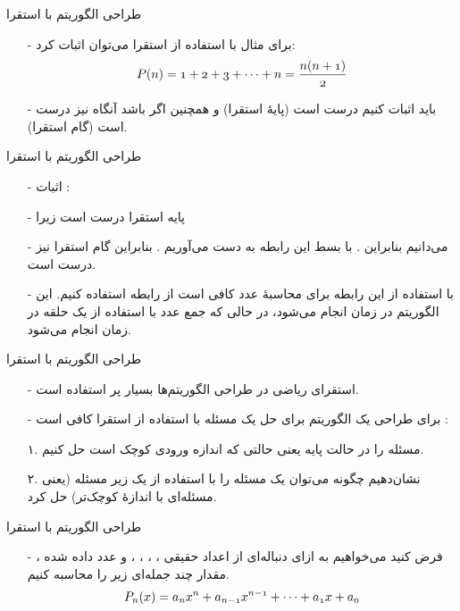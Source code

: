 \begin{frame}{‌طراحی الگوریتم با استقرا}
\begin{itemize}\itemr
\item[-]
برای مثال با استفاده از استقرا می‌توان اثبات کرد:
\begin{align*}
\mathnormal{P(n) = 1 + 2 + 3 + \cdots + n = \frac{n(n+1)}{2}}
\end{align*}
\item[-]
باید اثبات کنیم
درست است (پایهٔ استقرا) و همچنین اگر
باشد آنگاه
نیز درست است (گام استقرا).
\end{itemize}
\end{frame}


\begin{frame}{‌طراحی الگوریتم با استقرا}
\begin{itemize}\itemr
\item[-]
اثبات : 
\item[-]
پایه استقرا درست است زیرا 
\item[-]
می‌دانیم
بنابراین
 .
با بسط این رابطه به دست می‌آوریم
 .
بنابراین گام استقرا نیز درست است.
\item[-]
با استفاده از این رابطه برای محاسبهٔ
عدد کافی است از رابطه
استفاده کنیم. این الگوریتم در زمان
انجام می‌شود، در حالی که جمع 
عدد با استفاده از یک حلقه در زمان
انجام می‌شود.
\end{itemize}
\end{frame}



\begin{frame}{‌طراحی الگوریتم با استقرا}
\begin{itemize}\itemr
\item[-]
استقرای ریاضی در طراحی الگوریتم‌ها بسیار پر استفاده است.
\item[-]
برای طراحی یک الگوریتم برای حل یک مسئله با استفاده از استقرا کافی است :
\item[۱.]
مسئله را در حالت پایه یعنی حالتی که اندازه ورودی کوچک است حل کنیم.
\item[۲.]
نشان‌دهیم چگونه می‌توان یک مسئله را با استفاده از یک زیر مسئله (یعنی مسئله‌ای با اندازهٔ کوچک‌تر) حل کرد.
\end{itemize}
\end{frame}


\begin{frame}{‌طراحی الگوریتم با استقرا}
\begin{itemize}\itemr
\item[-]
فرض کنید می‌خواهیم به ازای دنباله‌ای از اعداد حقیقی
،
،
،
\m{\cdots}
،
و عدد داده شده
،
مقدار چند جمله‌ای زیر را محاسبه کنیم.\\
\begin{align*}
\mathnormal{P_n(x) = a_nx^n + a_{n-1}x^{n-1} + \cdots + a_1x + a_0}
\end{align*}
\end{itemize}
\end{frame}


